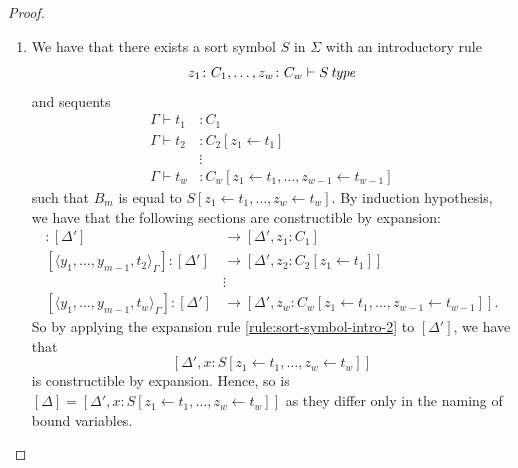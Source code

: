 \begin{proof}
\begin{enumerate}
            By induction hypothesis, \[
                \begin{tikzcd}
                    {[\Delta']} & {[\Delta', x \colon A]} \arrow[l, open] & {[\Delta', x \colon A, y \colon B]} \arrow[l, open]
                \end{tikzcd}
            \] is constructible by expansion. By applying rule \ref{rule:product-formation-2} to the object $[\Delta', x \colon A, y \colon B]$ we have that \[
                \Pi([\Delta, x \colon A, y \colon B]) = [\Delta', x \colon (\Pi x \colon A) B]
            \] is constructible by expansion. Then, so is $[\Delta] = [\Delta', x \colon (\Pi x \colon A) B]$ as they only differ on the naming of bound variables.
        \item We have that there exists a sort symbol $S$ in $\Sigma$ with an introductory rule $$z_1 \colon C_1, \dots, z_w \colon C_w \vdash S \operatorname{\mathit{\space type}}$$ and sequents
            \begin{align*}
                \Gamma \vdash t_1 &\colon C_1 \\
                \Gamma \vdash t_2 &\colon C_2[z_1 \leftarrow t_1] \\
                &\vdots \\
                \Gamma \vdash t_w &\colon C_w[z_1 \leftarrow t_1, \dots, z_{w-1} \leftarrow t_{w-1}]
            \end{align*}
            such that $B_m$ is equal to $S[z_1 \leftarrow t_1, \dots, z_w \leftarrow t_w]$.
            By induction hypothesis, we have that the following sections are constructible by expansion:
            \begin{align*}
                [\langle y_1, \dots, y_{m-1}, t_1 \rangle_\Gamma] \colon [\Delta'] &\to [\Delta', z_1 \colon C_1] \\
                [\langle y_1, \dots, y_{m-1}, t_2 \rangle_\Gamma] \colon [\Delta'] &\to [\Delta', z_2 \colon C_2[z_1 \leftarrow t_1]] \\
                & \vdots \\
                [\langle y_1, \dots, y_{m-1}, t_w \rangle_\Gamma] \colon [\Delta'] &\to [\Delta', z_w \colon C_w[z_1 \leftarrow t_1, \dots, z_{w-1} \leftarrow t_{w-1}]].
            \end{align*}
            So by applying the expansion rule \ref{rule:sort-symbol-intro-2} to $[\Delta']$, we have that $$[\Delta', x \colon S[z_1 \leftarrow t_1, \dots, z_w \leftarrow t_w]]$$ is constructible by expansion.
            Hence, so is $[\Delta] = [\Delta', x \colon S[z_1 \leftarrow t_1, \dots, z_w \leftarrow t_w]]$ as they differ only in the naming of bound variables.
    \end{enumerate}


\end{proof}

